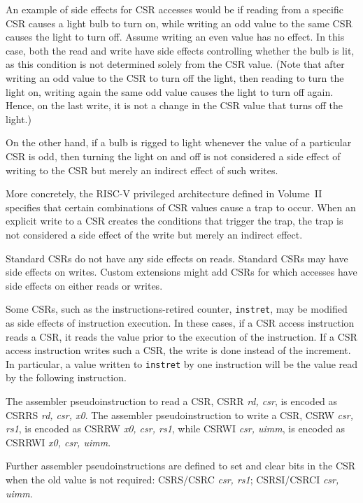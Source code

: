 \begin{commentary}
  An example of side effects for CSR accesses would be if reading from a
  specific CSR causes a light bulb to turn on, while writing an odd value
  to the same CSR causes the light to turn off.
  Assume writing an even value has no effect.
  In this case, both the read and write have side effects controlling
  whether the bulb is lit, as this condition is not determined solely
  from the CSR value.
  (Note that after writing an odd value to the CSR to turn off the light,
  then reading to turn the light on, writing again the same odd value
  causes the light to turn off again.
  Hence, on the last write, it is not a change in the CSR value that
  turns off the light.)

  On the other hand, if a bulb is rigged to light whenever the value
  of a particular CSR is odd, then turning the light on and off is not
  considered a side effect of writing to the CSR but merely an indirect
  effect of such writes.

  More concretely, the RISC-V privileged architecture defined in
  Volume~II specifies that certain combinations of CSR values cause a
  trap to occur.
  When an explicit write to a CSR creates the conditions that trigger the
  trap, the trap is not considered a side effect of the write but merely
  an indirect effect.

  Standard CSRs do not have any side effects on reads.
  Standard CSRs may have side effects on writes.
  Custom extensions might add CSRs for which accesses have side effects
  on either reads or writes.
\end{commentary}

Some CSRs, such as the instructions-retired counter, {\tt instret},
may be modified as side effects of instruction execution.  In these
cases, if a CSR access instruction reads a CSR, it reads the value
prior to the execution of the instruction.  If a CSR access
instruction writes such a CSR, the write is done instead of the
increment.  In particular, a value written to {\tt instret} by one
instruction will be the value read by the following instruction.

The assembler pseudoinstruction to read a CSR, CSRR {\em rd, csr}, is
encoded as CSRRS {\em rd, csr, x0}.  The assembler pseudoinstruction
to write a CSR, CSRW {\em csr, rs1}, is encoded as CSRRW {\em x0, csr,
  rs1}, while CSRWI {\em csr, uimm}, is encoded as CSRRWI {\em x0,
  csr, uimm}.

Further assembler pseudoinstructions are defined to set and clear
bits in the CSR when the old value is not required: CSRS/CSRC {\em
  csr, rs1}; CSRSI/CSRCI {\em csr, uimm}.


